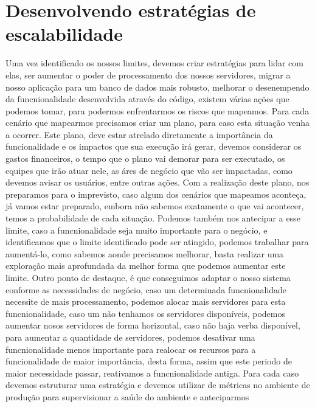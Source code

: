     \section{Desenvolvendo estratégias de escalabilidade}
      Uma vez identificado os nossos limites, devemos criar estratégias para lidar
      com elas, ser aumentar o poder de processamento dos nossos servidores,
      migrar a nosso aplicação para um banco de dados mais robusto, melhorar o
      desenempendo da funcnionalidade desenvolvida através do código, existem
      várias ações que podemos tomar, para podermos enfrentarmos os riscos que
      mapeamos. \newline
      Para cada cenário que mapearmos precisamos criar um plano, para caso esta
      situação venha a ocorrer. Este plano, deve estar atrelado diretamente a
      importância da funcionalidade e os impactos que sua execução irá gerar,
      devemos considerar os gastos financeiros, o tempo que o plano vai demorar
      para ser executado, os equipes que irão atuar nele, as áres de negócio que vão
      ser impactadas, como devemos avisar os usuários, entre outras ações. Com a
      realização deste plano, nos preparamos para o imprevisto, caso algum dos
      cenários que mapeamos aconteça, já vamos estar preparado, embora não sabemos
      exatamente o que vai acontecer, temos a probabilidade de cada situação. Podemos
      também nos antecipar a esse limite, caso a funcnionalidade seja muito importante
      para o negócio, e identificamos que o limite identificado pode ser atingido,
      podemos trabalhar para aumentá-lo, como sabemos aonde precisamos melhorar,
      basta realizar uma exploração mais aprofundada da melhor forma que podemos
      aumentar este limite. Outro ponto de destaque, é que conseguimos adaptar o
      nosso sistema conforme as necessidades de negócio, caso um determinada
      funcnionalidade necessite de mais processamento, podemos alocar mais servidores
      para esta funcnionalidade, caso um não tenhamos os servidores disponíveis,
      podemos aumentar nosos servidores de forma horizontal, caso não haja verba
      disponível, para aumentar a quantidade de servidores, podemos desativar uma
      funcnionalidade menos importante para realocar os recursos para a funcionalidade
      de maior importância, desta forma, assim que este periodo de maior necessidade
      passar, reativamos a funcnionalidade antiga. \newline
      Para cada caso devemos estruturar uma estratégia e devemos utilizar de métricas
      no ambiente de produção para supervisionar a saúde do ambiente e anteciparmos
